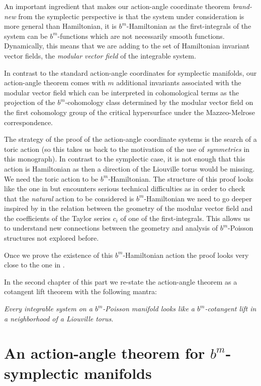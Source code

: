 An important ingredient that makes our action-angle coordinate theorem \emph{brand-new } from the symplectic perspective is that the system under consideration is more general than Hamiltonian, it is $b^m$-Hamiltonian as the first-integrals of the system can be $b^m$-functions which are not necessarily smooth functions. Dynamically, this means that we are adding to the set of Hamiltonian invariant vector fields, the \emph{modular vector field} of the integrable system.

In contrast to the standard action-angle coordinates for symplectic manifolds, our action-angle theorem comes with $m$ additional invariants associated with the modular vector field which can be interpreted in cohomological terms as the projection of the $b^m$-cohomology class determined by the modular vector field on the first cohomology group of the critical hypersurface under the Mazzeo-Melrose correspondence.

The strategy of the proof of the action-angle coordinate systems is the search of a toric action (so this takes us back to the motivation of the use of \emph{symmetries} in this monograph). In contrast to the symplectic case, it is not enough that this action is Hamiltonian as then a direction of the Liouville torus would be missing. We need the toric action to be $b^m$-Hamiltonian.
The structure of this proof looks like the one in \cite{KMS16} but encounters serious technical difficulties as in order to check that the \emph{natural} action to be considered is
$b^m$-Hamiltonian we need to go deeper inspired by \cite{Scott16}  in the relation between the geometry of the modular vector field and the coefficients of the Taylor series $c_i$ of one of the first-integrals. This allows us to understand new connections between the geometry and analysis of $b^m$-Poisson structures not explored before.

Once we prove the existence of this $b^m$-Hamiltonian action the proof looks very close to the one in \cite{KMS16}.

In the second chapter of this part
we re-state the action-angle theorem as a cotangent lift theorem with the following mantra:


 \emph{Every integrable system on a $b^m$-Poisson manifold looks like a $b^m$-cotangent lift in a neighborhood of a Liouville torus.}




\chapter{An action-angle theorem for $b^m$-symplectic manifolds}

